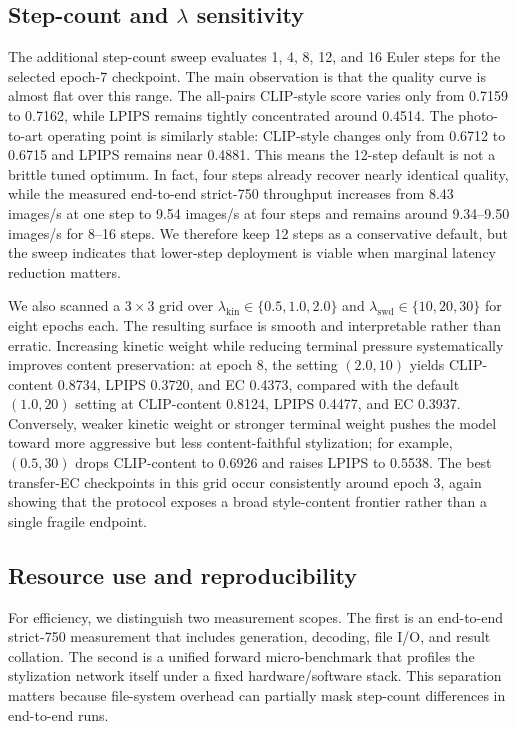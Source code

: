 ﻿\documentclass[letterpaper]{article}
\begin{document}
\subsection{Step-count and $\lambda$ sensitivity}
The additional step-count sweep evaluates 1, 4, 8, 12, and 16 Euler steps for the selected epoch-7 checkpoint. The main observation is that the quality curve is almost flat over this range. The all-pairs CLIP-style score varies only from 0.7159 to 0.7162, while LPIPS remains tightly concentrated around 0.4514. The photo-to-art operating point is similarly stable: CLIP-style changes only from 0.6712 to 0.6715 and LPIPS remains near 0.4881. This means the 12-step default is not a brittle tuned optimum. In fact, four steps already recover nearly identical quality, while the measured end-to-end strict-750 throughput increases from 8.43 images/s at one step to 9.54 images/s at four steps and remains around 9.34--9.50 images/s for 8--16 steps. We therefore keep 12 steps as a conservative default, but the sweep indicates that lower-step deployment is viable when marginal latency reduction matters.

We also scanned a $3 \times 3$ grid over $\lambda_{\mathrm{kin}} \in \{0.5, 1.0, 2.0\}$ and $\lambda_{\mathrm{swd}} \in \{10, 20, 30\}$ for eight epochs each. The resulting surface is smooth and interpretable rather than erratic. Increasing kinetic weight while reducing terminal pressure systematically improves content preservation: at epoch 8, the setting $(2.0, 10)$ yields CLIP-content 0.8734, LPIPS 0.3720, and EC 0.4373, compared with the default $(1.0, 20)$ setting at CLIP-content 0.8124, LPIPS 0.4477, and EC 0.3937. Conversely, weaker kinetic weight or stronger terminal weight pushes the model toward more aggressive but less content-faithful stylization; for example, $(0.5, 30)$ drops CLIP-content to 0.6926 and raises LPIPS to 0.5538. The best transfer-EC checkpoints in this grid occur consistently around epoch 3, again showing that the protocol exposes a broad style-content frontier rather than a single fragile endpoint.

\subsection{Resource use and reproducibility}
For efficiency, we distinguish two measurement scopes. The first is an end-to-end strict-750 measurement that includes generation, decoding, file I/O, and result collation. The second is a unified forward micro-benchmark that profiles the stylization network itself under a fixed hardware/software stack. This separation matters because file-system overhead can partially mask step-count differences in end-to-end runs.
\end{document}
